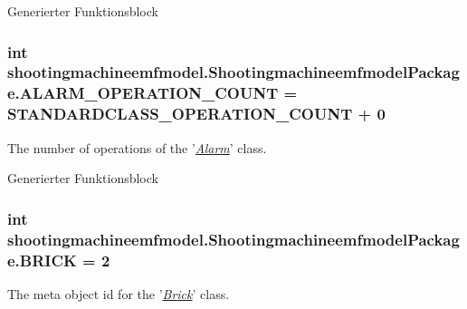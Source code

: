 Generierter Funktionsblock  \hypertarget{interfaceshootingmachineemfmodel_1_1_shootingmachineemfmodel_package_a4abb13fde140669afe6ee64c769d6431}{
\subsubsection[{A\-L\-A\-R\-M\-\_\-\-O\-P\-E\-R\-A\-T\-I\-O\-N\-\_\-\-C\-O\-U\-N\-T}]{\setlength{\rightskip}{0pt plus 5cm}int shootingmachineemfmodel.\-Shootingmachineemfmodel\-Package.\-A\-L\-A\-R\-M\-\_\-\-O\-P\-E\-R\-A\-T\-I\-O\-N\-\_\-\-C\-O\-U\-N\-T = {\bf S\-T\-A\-N\-D\-A\-R\-D\-C\-L\-A\-S\-S\-\_\-\-O\-P\-E\-R\-A\-T\-I\-O\-N\-\_\-\-C\-O\-U\-N\-T} + 0}}\label{interfaceshootingmachineemfmodel_1_1_shootingmachineemfmodel_package_a4abb13fde140669afe6ee64c769d6431}
The number of operations of the '{\itshape \hyperlink{interfaceshootingmachineemfmodel_1_1_alarm}{Alarm}}' class.

Generierter Funktionsblock  \hypertarget{interfaceshootingmachineemfmodel_1_1_shootingmachineemfmodel_package_a6355a6c7462f68952499f472884795ab}{
\subsubsection[{B\-R\-I\-C\-K}]{\setlength{\rightskip}{0pt plus 5cm}int shootingmachineemfmodel.\-Shootingmachineemfmodel\-Package.\-B\-R\-I\-C\-K = 2}}\label{interfaceshootingmachineemfmodel_1_1_shootingmachineemfmodel_package_a6355a6c7462f68952499f472884795ab}
The meta object id for the '\hyperlink{classshootingmachineemfmodel_1_1impl_1_1_brick_impl}{{\itshape Brick}}' class.

